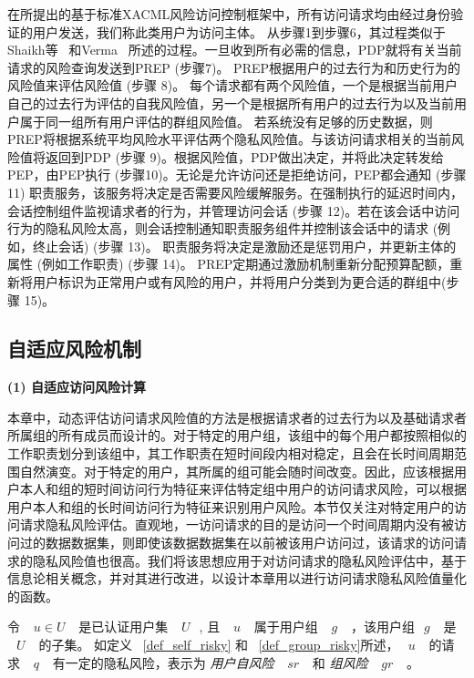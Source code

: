 在所提出的基于标准XACML风险访问控制框架中，所有访问请求均由经过身份验证的用户发送，我们称此类用户为访问主体。 从步骤1到步骤6，其过程类似于Shaikh等~\cite{shaikh2012dynamic} 和Verma ~\cite{verma2004xml}所述的过程。一旦收到所有必需的信息，PDP就将有关当前请求的风险查询发送到PREP (步骤7)。 PREP根据用户的过去行为和历史行为的风险值来评估风险值 (步骤 8)。 每个请求都有两个风险值，一个是根据当前用户自己的过去行为评估的自我风险值，另一个是根据所有用户的过去行为以及当前用户属于同一组所有用户评估的群组风险值。
若系统没有足够的历史数据，则PREP将根据系统平均风险水平评估两个隐私风险值。与该访问请求相关的当前风险值将返回到PDP (步骤 9)。根据风险值，PDP做出决定，并将此决定转发给PEP，由PEP执行 (步骤10)。无论是允许访问还是拒绝访问，PEP都会通知 (步骤 11) 职责服务，该服务将决定是否需要风险缓解服务。在强制执行的延迟时间内，会话控制组件监视请求者的行为，并管理访问会话 (步骤 12)。若在该会话中访问行为的隐私风险太高，则会话控制通知职责服务组件并控制该会话中的请求 (例如，终止会话) (步骤 13)。 职责服务将决定是激励还是惩罚用户，并更新主体的属性 (例如工作职责) (步骤 14)。 PREP定期通过激励机制重新分配预算配额，重新将用户标识为正常用户或有风险的用户，并将用户分类到为更合适的群组中(步骤 15)。

\subsection{自适应风险机制}
\label{subsec:risk values and decision}

\textbf{(1) 自适应访问风险计算}

本章中，动态评估访问请求风险值的方法是根据请求者的过去行为以及基础请求者所属组的所有成员而设计的。对于特定的用户组，该组中的每个用户都按照相似的工作职责划分到该组中，其工作职责在短时间段内相对稳定，且会在长时间周期范围自然演变。对于特定的用户，其所属的组可能会随时间改变。因此，应该根据用户本人和组的短时间访问行为特征来评估特定组中用户的访问请求风险，可以根据用户本人和组的长时间访问行为特征来识别用户风险。本节仅关注对特定用户的访问请求隐私风险评估。直观地，一访问请求的目的是访问一个时间周期内没有被访问过的数据数据集，则即使该数据数据集在以前被该用户访问过，该请求的访问请求的隐私风险值也很高。我们将该思想应用于对访问请求的隐私风险评估中，基于信息论相关概念，并对其进行改进，以设计本章用以进行访问请求隐私风险值量化的函数。

令 ~$~u \in U~$~ 是已认证用户集 ~$~U~$~, 且 ~$~u~$~ 属于用户组 ~$~g~$~ ，该用户组~$~g~$~ 是 ~$~U~$~ 的子集。 如定义 ~\ref{def_self_risky} 和 ~\ref{def_group_risky}所述，~$~u~$~ 的请求 ~$~q~$~ 有一定的隐私风险，表示为 \emph{用户自风险} ~$~sr~$~ 和 \emph{组风险} ~$~gr~$~ 。

